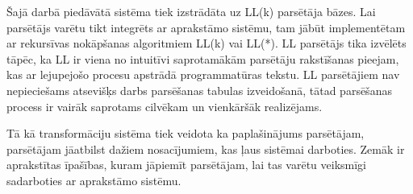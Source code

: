 Šajā darbā piedāvātā sistēma tiek izstrādāta uz LL(k) parsētāja bāzes. Lai parsētājs varētu tikt integrēts ar aprakstāmo sistēmu, tam jābūt implementētam ar rekursīvas nokāpšanas algoritmiem LL(k) vai LL(*). LL parsētājs tika izvēlēts tāpēc, ka LL ir viena no intuitīvi saprotamākām parsētāju rakstīšanas pieejam, kas ar lejupejošo procesu apstrādā programmatūras tekstu. LL parsētājiem nav nepieciešams atsevišķs darbs parsēšanas tabulas izveidošanā, tātad parsēšanas process ir vairāk saprotams cilvēkam un vienkāršāk realizējams.

Tā kā transformāciju sistēma tiek veidota ka paplašinājums parsētājam, parsētājam jāatbilst dažiem nosacījumiem, kas ļaus sistēmai darboties. Zemāk ir aprakstītas īpašības, kuram jāpiemīt parsētājam, lai tas varētu veiksmīgi sadarboties ar aprakstāmo sistēmu.

